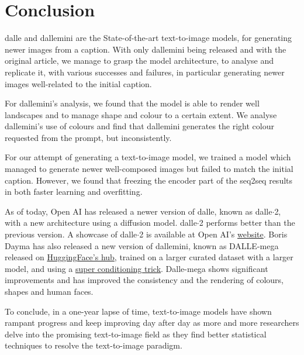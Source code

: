 \documentclass{article}
\begin{document}
\pagebreak

\section{Conclusion}

\begin{multicols}{2}
\gls{dalle} and \gls{dallemini} are the State-of-the-art text-to-image models, for generating newer images from a caption. With only \gls{dallemini} being released and with the original article, we manage to grasp the model architecture, to analyse and replicate it, with various successes and failures, in particular generating newer images well-related to the initial caption.

For \gls{dallemini}'s analysis, we found that the model is able to render well landscapes and to manage shape and colour to a certain extent. We analyse \gls{dallemini}'s use of colours and find that \gls{dallemini} generates the right colour requested from the prompt, but inconsistently. 

For our attempt of generating a text-to-image model, we trained a model which managed to generate newer well-composed images but failed to match the initial caption. However, we found that freezing the encoder part of the seq2seq results in both faster learning and overfitting.

As of today, Open AI has released a newer version of \gls{dalle}, known as \gls{dalle}$\cdot$2, with a new architecture using a diffusion model. \gls{dalle}$\cdot$2 performs better than the previous version. A showcase of \gls{dalle}$\cdot$2 is available at Open AI's \href{https://openai.com/dall-e-2/}{website}.
Boris Dayma has also released a new version of \gls{dallemini}, known as DALLE-mega released on \href{https://huggingface.co/spaces/dalle-mini/dalle-mini}{HuggingFace's hub}, trained on a larger curated dataset with a larger model, and using a  \href{https://twitter.com/rivershavewings/status/1478093658716966912}{super conditioning trick}. Dalle-mega shows significant improvements and has improved the consistency and the rendering of colours, shapes and human faces.

To conclude, in a one-year lapse of time, text-to-image models have shown rampant progress and keep improving day after day as more and more researchers delve into the promising text-to-image field as they find better statistical techniques to resolve the text-to-image paradigm.

\end{multicols}
\pagebreak
{}
{}
\end{document}
